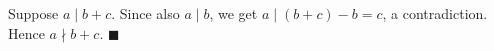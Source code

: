 Suppose $a\mid b+c$. Since also $a\mid b$, we get $a\mid(b+c)-b=c$, a contradiction. Hence $a\nmid b+c$. $\blacksquare$
